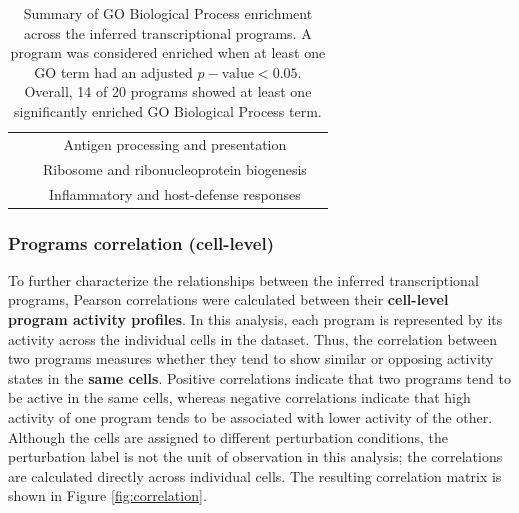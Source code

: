 \documentclass[11pt,a4paper]{article}
\newcommand{\enrichedbox}{%
	\makebox[0.65cm][l]{\textcolor{darkishgreen}{\rule{0.18cm}{0.18cm}}}%
}
\begin{document}
\begin{table}[htbp]
\begin{tabular*}{\linewidth}{@{\extracolsep{\fill}} cccl }
		& \enrichedbox\makebox[0.3cm][r]{18} & Antigen processing and presentation & \\
		& \enrichedbox\makebox[0.3cm][r]{19} & Ribosome and ribonucleoprotein biogenesis & \\
		& \enrichedbox\makebox[0.3cm][r]{20} & Inflammatory and host-defense responses & \\
		\hline
	\end{tabular*}
	\caption{Summary of GO Biological Process enrichment across the inferred transcriptional programs. A program was considered enriched when at least one GO term had an adjusted $p-\text{value}<0.05$. Overall, 14 of 20 programs showed at least one significantly enriched GO Biological Process term.}
		\label{tab:ora_summary}
	\end{table}


\subsubsection{Programs correlation (cell-level)}


To further characterize the relationships between the inferred transcriptional programs, Pearson correlations were calculated between their \textbf{cell-level program activity profiles}. In this analysis, each program is represented by its activity across the individual cells in the dataset. Thus, the correlation between two programs measures whether they tend to show similar or opposing activity states in the \textbf{same cells}. Positive correlations indicate that two programs tend to be active in the same cells, whereas negative correlations indicate that high activity of one program tends to be associated with lower activity of the other. Although the cells are assigned to different perturbation conditions, the perturbation label is not the unit of observation in this analysis; the correlations are calculated directly across individual cells. The resulting correlation matrix is shown in Figure \ref{fig:correlation}.
\end{document}
